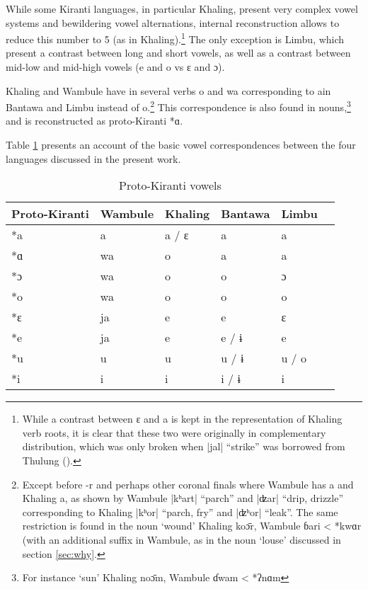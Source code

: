 \documentclass[oldfontcommands,oneside,a4paper,11pt]{article}
\newcommand{\ipa}[1]{{\phon\mbox{#1}}} %
\newcommand{\dhatu}[2]{|\ipa{#1}| ``#2''}
\begin{document}
While some Kiranti languages, in particular Khaling, present very complex vowel systems and bewildering vowel alternations, internal reconstruction allows to reduce this number to 5 (as in Khaling).\footnote{While a contrast between \ipa{ɛ} and \ipa{a} is kept in the representation of Khaling verb roots, it is clear that these two were originally in complementary distribution, which was only broken when \dhatu{jal}{strike} was borrowed from Thulung (\citealt[1110]{jacques12khaling}).} The only exception is Limbu, which present a contrast between long and short vowels, as well as a contrast between mid-low and mid-high vowels (\ipa{e} and \ipa{o} vs \ipa{ɛ} and \ipa{ɔ}).  

Khaling and Wambule have in several verbs \ipa{o} and \ipa{wa} corresponding to \ipa{a}in Bantawa and Limbu instead of \ipa{o}.\footnote{Except before \ipa{-r} and perhaps other coronal finals where Wambule has \ipa{a} and Khaling \ipa{a}, as shown by Wambule \dhatu{kʰart}{parch}	 	
and \dhatu{ʣar}{drip, drizzle}	corresponding to Khaling 	\dhatu{kʰor}{parch, fry} and \dhatu{ʣʰor}{leak}. The same restriction is found in the noun `wound' Khaling \ipa{koɔ̄r}, Wambule \ipa{ɓari} < *\ipa{kwɑr} (with an additional suffix in Wambule, as in the noun `louse' discussed in section \ref{sec:why}.} This correspondence is also found in nouns,\footnote{For instance `sun' Khaling \ipa{noɔ̄m}, Wambule \ipa{ɗwam} < *\ipa{ʔnɑm}} and is reconstructed as proto-Kiranti *\ipa{ɑ}.

Table \ref{tab:vowels} presents an account of the basic vowel correspondences between the four languages discussed in the present work.

\begin{table}[H]
\caption{Proto-Kiranti vowels} \centering \label{tab:vowels}
\begin{tabular}{llllll}
\toprule
Proto-Kiranti & Wambule & Khaling & Bantawa & Limbu \\
\midrule
\ipa{*a} & \ipa{a} & \ipa{a}  / \ipa{ɛ} & \ipa{a} & \ipa{a}  \\
\ipa{*ɑ} & \ipa{wa} & \ipa{o} & \ipa{a} & \ipa{a}  \\
\ipa{*ɔ} & \ipa{wa} & \ipa{o} & \ipa{o} & \ipa{ɔ}  \\
\ipa{*o} & \ipa{wa} & \ipa{o} & \ipa{o} & \ipa{o}  \\
\ipa{*ɛ} & \ipa{ja} & \ipa{e} & \ipa{e}  & \ipa{ɛ}  \\
\ipa{*e} & \ipa{ja} & \ipa{e} & \ipa{e}  / \ipa{ɨ} & \ipa{e}    \\
\ipa{*u} & \ipa{u} & \ipa{u} & \ipa{u} /  \ipa{ɨ} \  & \ipa{u} / \ipa{o} \\
\ipa{*i} & \ipa{i} & \ipa{i} & \ipa{i}  / \ipa{ɨ} & \ipa{i}  \\
\bottomrule
\end{tabular}
\end{table}
  
\end{document}
